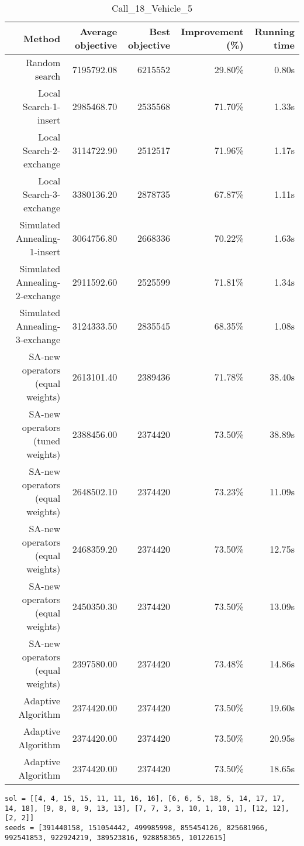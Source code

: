 \begin{table}[ht]
\centering
\caption{Call\_18\_Vehicle\_5}
\label{tab:call18vehicle5}
\begin{tabular}{|r|r|r|r|r|}
Method & Average objective & Best objective & Improvement (\%) & Running time \\
\hline
Random search & 7195792.08 & 6215552 & 29.80\% & 0.80s\\
Local Search-1-insert & 2985468.70 & 2535568 & 71.70\% & 1.33s\\
Local Search-2-exchange & 3114722.90 & 2512517 & 71.96\% & 1.17s\\
Local Search-3-exchange & 3380136.20 & 2878735 & 67.87\% & 1.11s\\
Simulated Annealing-1-insert & 3064756.80 & 2668336 & 70.22\% & 1.63s\\
Simulated Annealing-2-exchange & 2911592.60 & 2525599 & 71.81\% & 1.34s\\
Simulated Annealing-3-exchange & 3124333.50 & 2835545 & 68.35\% & 1.08s\\
SA-new operators (equal weights) & 2613101.40 & 2389436 & 71.78\% & 38.40s\\
SA-new operators (tuned weights) & 2388456.00 & 2374420 & 73.50\% & 38.89s\\
SA-new operators (equal weights) & 2648502.10 & 2374420 & 73.23\% & 11.09s\\
SA-new operators (equal weights) & 2468359.20 & 2374420 & 73.50\% & 12.75s\\
SA-new operators (equal weights) & 2450350.30 & 2374420 & 73.50\% & 13.09s\\
SA-new operators (equal weights) & 2397580.00 & 2374420 & 73.48\% & 14.86s\\
Adaptive Algorithm & 2374420.00 & 2374420 & 73.50\% & 19.60s\\
Adaptive Algorithm & 2374420.00 & 2374420 & 73.50\% & 20.95s\\
Adaptive Algorithm & 2374420.00 & 2374420 & 73.50\% & 18.65s\\
\end{tabular}%
\end{table}
\begin{lstlisting}[label={lst:call18vehicle5},caption=Optimal solution call\_18\_vehicle\_5]
sol = [[4, 4, 15, 15, 11, 11, 16, 16], [6, 6, 5, 18, 5, 14, 17, 17, 14, 18], [9, 8, 8, 9, 13, 13], [7, 7, 3, 3, 10, 1, 10, 1], [12, 12], [2, 2]]
seeds = [391440158, 151054442, 499985998, 855454126, 825681966, 992541853, 922924219, 389523816, 928858365, 10122615]
\end{lstlisting}%
\clearpage



